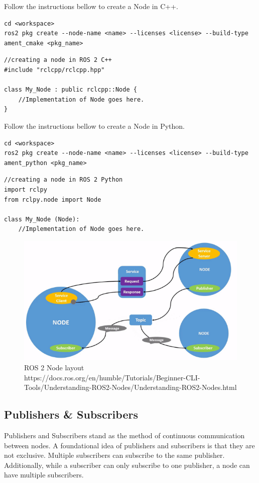 \documentclass[11pt]{article}
\begin{document}
Follow the instructions bellow to create a Node in C++.
\lstset{language=bash}
\begin{lstlisting}
cd <workspace>
ros2 pkg create --node-name <name> --licenses <license> --build-type ament_cmake <pkg_name>
\end{lstlisting}

\lstset{language=C++}
\begin{lstlisting}
//creating a node in ROS 2 C++
#include "rclcpp/rclcpp.hpp"

class My_Node : public rclcpp::Node {
	//Implementation of Node goes here.
}
\end{lstlisting}
Follow the instructions bellow to create a Node in Python.
\lstset{language=bash}
\begin{lstlisting}
cd <workspace>
ros2 pkg create --node-name <name> --licenses <license> --build-type ament_python <pkg_name>
\end{lstlisting}
\lstset{language=Python}
\begin{lstlisting}
//creating a node in ROS 2 Python
import rclpy
from rclpy.node import Node

class My_Node (Node):
	//Implementation of Node goes here.
\end{lstlisting}



\begin{figure}[hbtp]
\centering
\includegraphics[scale=0.5]{Nodes.png}
\caption{ROS 2 Node layout\\ https://docs.ros.org/en/humble/Tutorials/Beginner-CLI-Tools/Understanding-ROS2-Nodes/Understanding-ROS2-Nodes.html}
\end{figure}
\newpage

\subsection{Publishers \& Subscribers}
Publishers and Subscribers stand as the method of continuous communication between nodes. A foundational idea of publishers and subscribers is that they are not exclusive. Multiple subscribers can subscribe to the same publisher. Additionally, while a subscriber can only subscribe to one publisher, a node can have multiple subscribers.
\end{document}
